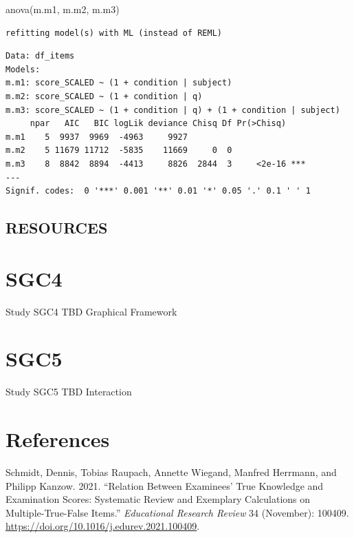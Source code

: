 \documentclass[
  letterpaper,
  DIV=11,
  numbers=noendperiod]{scrreprt}
\newenvironment{Shaded}{\begin{snugshade}}{\end{snugshade}}
\newcommand{\FunctionTok}[1]{\textcolor[rgb]{0.28,0.35,0.67}{#1}}
\newcommand{\NormalTok}[1]{\textcolor[rgb]{0.00,0.23,0.31}{#1}}
\newlength{\cslhangindent}
\newlength{\cslentryspacingunit} %
\newenvironment{CSLReferences}[2] %
 {%
  \setlength{\parindent}{0pt}
  \ifodd #1
  \let\oldpar\par
  \def\par{\hangindent=\cslhangindent\oldpar}
  \fi
  \setlength{\parskip}{#2\cslentryspacingunit}
 }%
 {}
\begin{document}
\begin{Shaded}
\begin{Highlighting}[]
\FunctionTok{anova}\NormalTok{(m.m1, m.m2, m.m3)}
\end{Highlighting}
\end{Shaded}

\begin{verbatim}
refitting model(s) with ML (instead of REML)
\end{verbatim}

\begin{verbatim}
Data: df_items
Models:
m.m1: score_SCALED ~ (1 + condition | subject)
m.m2: score_SCALED ~ (1 + condition | q)
m.m3: score_SCALED ~ (1 + condition | q) + (1 + condition | subject)
     npar   AIC   BIC logLik deviance Chisq Df Pr(>Chisq)    
m.m1    5  9937  9969  -4963     9927                        
m.m2    5 11679 11712  -5835    11669     0  0               
m.m3    8  8842  8894  -4413     8826  2844  3     <2e-16 ***
---
Signif. codes:  0 '***' 0.001 '**' 0.01 '*' 0.05 '.' 0.1 ' ' 1
\end{verbatim}

\hypertarget{resources-4}{%
\section{RESOURCES}\label{resources-4}}


\hypertarget{sgc4}{%
\chapter{SGC4}\label{sgc4}}

Study SGC4 \textbar{} TBD Graphical Framework

\hfill\break


\hypertarget{sgc5}{%
\chapter{SGC5}\label{sgc5}}

Study SGC5 \textbar{} TBD Interaction

\hfill\break


\hypertarget{references}{%
\chapter*{References}\label{references}}

\hypertarget{refs}{}
\begin{CSLReferences}{1}{0}
\leavevmode{}%
Schmidt, Dennis, Tobias Raupach, Annette Wiegand, Manfred Herrmann, and
Philipp Kanzow. 2021. {``Relation Between Examinees' True Knowledge and
Examination Scores: Systematic Review and Exemplary Calculations on
{Multiple}-{True}-{False} Items.''} \emph{Educational Research Review}
34 (November): 100409.
\url{https://doi.org/10.1016/j.edurev.2021.100409}.

\end{CSLReferences}
\end{document}

